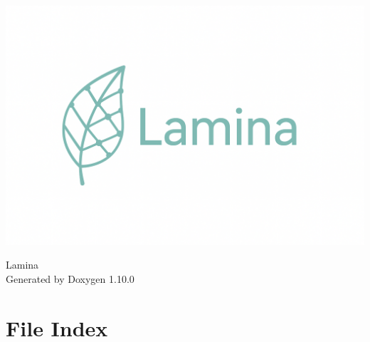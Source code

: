 \documentclass[twoside]{book}
\newcommand{\+}{\discretionary{\mbox{\scriptsize$\hookleftarrow$}}{}{}}
\newcommand{\clearemptydoublepage}{%
    \newpage{\pagestyle{empty}\cleardoublepage}%
  }
\begin{document}
  \raggedbottom
    \hypersetup{pageanchor=false,
                bookmarksnumbered=true,
                pdfencoding=unicode
               }
  \begin{titlepage}
  \vspace*{7cm}
  \begin{center}%
   \begin{center}
    \includegraphics[width=\textwidth]{./LogoLaminaLatex.png}
    \end{center}
  {\Large Lamina}\\
  \vspace*{1cm}
  {\large Generated by Doxygen 1.10.0}\\
  \end{center}
  \end{titlepage}
  \clearemptydoublepage
  \tableofcontents
  \clearemptydoublepage
  \hypersetup{pageanchor=true}

\chapter{File Index}

\end{document}
